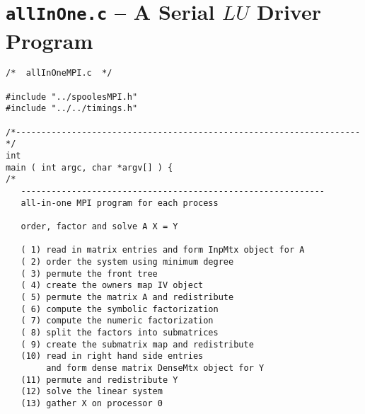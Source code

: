 \vfill \eject
\section{{\tt allInOne.c} -- A Serial $LU$ Driver Program}
\label{section:LU-MPI-driver}

\begin{verbatim}
/*  allInOneMPI.c  */

#include "../spoolesMPI.h"
#include "../../timings.h"

/*--------------------------------------------------------------------*/
int
main ( int argc, char *argv[] ) {
/*
   ------------------------------------------------------------
   all-in-one MPI program for each process

   order, factor and solve A X = Y

   ( 1) read in matrix entries and form InpMtx object for A
   ( 2) order the system using minimum degree
   ( 3) permute the front tree
   ( 4) create the owners map IV object
   ( 5) permute the matrix A and redistribute
   ( 6) compute the symbolic factorization 
   ( 7) compute the numeric factorization
   ( 8) split the factors into submatrices
   ( 9) create the submatrix map and redistribute
   (10) read in right hand side entries 
        and form dense matrix DenseMtx object for Y
   (11) permute and redistribute Y
   (12) solve the linear system
   (13) gather X on processor 0


\end{verbatim}

